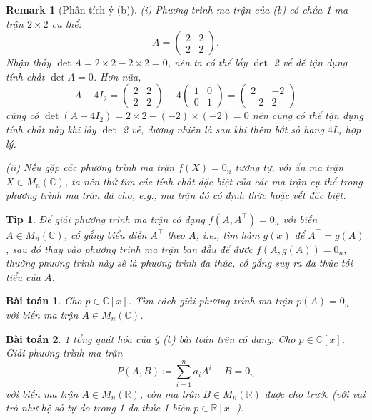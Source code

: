 \documentclass{article}
\newtheorem{baitoan}{Bài toán}
\newtheorem{remark}{Remark}
\newtheorem{tip}{Tip}
\begin{document}
\begin{remark}[Phân tích ý (b)]
	\item(i) Phương trình ma trận của (b) có chứa 1 ma trận $2\times2$ cụ thể:
	\begin{equation*}
		A = \begin{pmatrix}
			2 & 2\\2 & 2
		\end{pmatrix}.
	\end{equation*}
	Nhận thấy $\det A = 2\times2 - 2\times2 = 0$, nên ta có thể lấy $\det$ 2 vế để tận dụng tính chất $\det A = 0$. Hơn nữa,
	\begin{equation*}
		A - 4I_2 = \begin{pmatrix}
			2 & 2\\2 & 2
		\end{pmatrix} - 4\begin{pmatrix}
			1 & 0 \\0 & 1
		\end{pmatrix} = \begin{pmatrix}
			2 & -2\\-2 & 2
		\end{pmatrix}
	\end{equation*}
	cũng có $\det(A - 4I_2) = 2\times2 - (-2)\times(-2) = 0$ nên cũng có thể tận dụng tính chất này khi lấy $\det$ 2 vế, đương nhiên là sau khi thêm bớt số hạng $4I_n$ hợp lý.
	\item(ii) Nếu gặp các phương trình ma trận $f(X) = 0_n$ tương tự, với ẩn ma trận $X\in M_n(\mathbb{C})$, ta nên thử tìm các tính chất đặc biệt của các ma trận cụ thể trong phương trình ma trận đã cho, e.g., ma trận đó có định thức hoặc vết đặc biệt.
\end{remark}

\begin{tip}
	Để giải phương trình ma trận có dạng $f(A,A^\top) = 0_n$ với biến $A\in M_n(\mathbb{C})$, cố gắng biểu diễn $A^\top$ theo $A$, i.e., tìm hàm $g(x)$ để $A^\top = g(A)$, sau đó thay vào phương trình ma trận ban đầu để được $f(A,g(A)) = 0_n$, thường phương trình này sẽ là phương trình đa thức, cố gắng suy ra đa thức tối tiểu của $A$.
\end{tip}

\begin{baitoan}
	Cho $p\in\mathbb{C}[x]$. Tìm cách giải phương trình ma trận $p(A) = 0_n$ với biến ma trận $A\in M_n(\mathbb{C})$.
\end{baitoan}

\begin{baitoan}
	1 tổng quát hóa của ý (b) bài toán trên có dạng: Cho $p\in\mathbb{C}[x]$. Giải phương trình ma trận
	\begin{equation*}
		P(A,B)\coloneqq\sum_{i=1}^n a_iA^i + B = 0_n
	\end{equation*}
	với biến ma trận $A\in M_n(\mathbb{R})$, còn ma trận $B\in M_n(\mathbb{R})$ được cho trước (với vai trò như hệ số tự do trong 1 đa thức 1 biến $p\in\mathbb{R}[x]$).
\end{baitoan}
\end{document}
